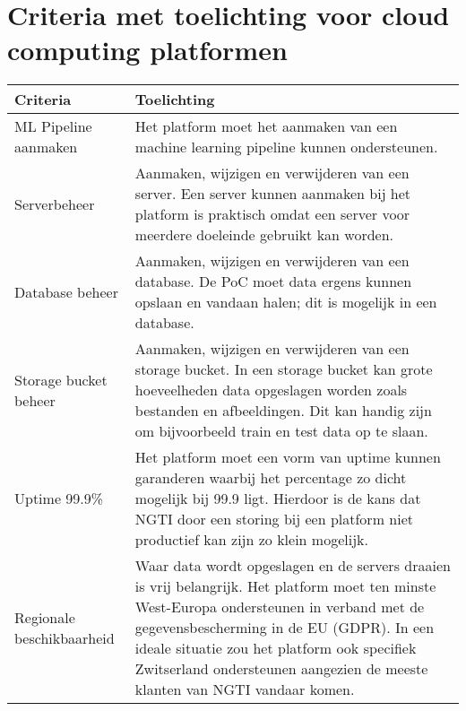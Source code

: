 \section*{Criteria met toelichting voor cloud computing platformen}\label{appendix:criteria-with-elaboration-for-cloud-computing-platforms}

\begin{table}[hbt!]
  \centering
  \begin{tabular}{|p{.2\linewidth}|p{.69\linewidth}|}
  \hline
  \textbf{Criteria} & \textbf{Toelichting} \\ \hline
    ML Pipeline \newline aanmaken
    &
    Het platform moet het aanmaken van een machine learning pipeline kunnen ondersteunen. 
    \\ \hline

    Serverbeheer
    &
    Aanmaken, wijzigen en verwijderen van een server. Een server kunnen aanmaken bij het platform is praktisch omdat een server voor meerdere doeleinde gebruikt kan worden.
    \\ \hline

    Database beheer
    &
    Aanmaken, wijzigen en verwijderen van een database. De PoC moet data ergens kunnen opslaan en vandaan halen; dit is mogelijk in een database.
    \\ \hline

    Storage \newline bucket beheer
    &
    Aanmaken, wijzigen en verwijderen van een storage bucket. In een storage bucket kan grote hoeveelheden data opgeslagen worden zoals bestanden en afbeeldingen. Dit kan handig zijn om bijvoorbeeld train en test data op te slaan.
    \\ \hline

    Uptime 99.9\%
    &
    Het platform moet een vorm van uptime kunnen garanderen waarbij het percentage zo dicht mogelijk bij 99.9 ligt. Hierdoor is de kans dat NGTI door een storing bij een platform niet productief kan zijn zo klein mogelijk.
    \\ \hline

    Regionale \newline beschikbaarheid
    &
    Waar data wordt opgeslagen en de servers draaien is vrij belangrijk. Het platform moet ten minste West-Europa ondersteunen in verband met de gegevensbescherming in de EU (GDPR). In een ideale situatie zou het platform ook specifiek Zwitserland ondersteunen aangezien de meeste klanten van NGTI vandaar komen.
    \\ \hline


\end{tabular}
\end{table}
